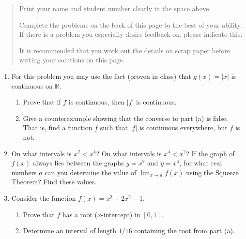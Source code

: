 \documentclass[12pt]{article}
\newcommand{\abs}[1]{\lvert #1\rvert}
\newcommand{\R}{\mathbb{R}}
\begin{document}
\begin{quote}
Print your name and student number clearly in the space above. 

\medskip

Complete the problems on the back of this page to the best of your ability. If there is a problem you especially desire feedback on, please indicate this. 

\medskip

It is recommended that you work out the details on scrap paper before writing your solutions on this page.
\end{quote}
\newpage
\thispagestyle{empty}
\begin{enumerate}
 \item  For this problem you may use the fact (proven in class) that $g(x)=\abs{x}$ is continuous on $\R$.
 \begin{enumerate}
 \item Prove that if $f$ is continuous, then $\abs{f}$ is continuous.
 
 \vspace{2in}
 
 \item Give a counterexample showing that the converse to part (a) is false. That is, find a function $f$ such that $\abs{f}$ is continuous everywhere, but $f$ is not.
 \end{enumerate}
 
 \vspace{2in}
 
 \item On what intervals is $x^2<x^4$? On what intervals is $x^4<x^2$? If the graph of $f(x)$ always lies between the graphs $y=x^2$ and $y=x^4$, for what real numbers $a$ can you determine the value of $\lim_{x\to a}f(x)$ using the Squeeze Theorem? Find these values.
 
 \pagebreak
 
 
 \item Consider the function $f(x)=x^3+2x^2-1$.
 \begin{enumerate}
 \item Prove that $f$ has a root ($x$-intercept) in $[0,1]$.
 
 \vspace{3in}
 
 \item Determine an interval of length $1/16$ containing the root from part (a).
 \end{enumerate}


\end{enumerate}
\end{document}
